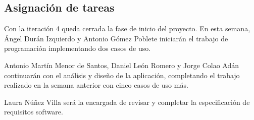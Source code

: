 \documentclass[a4paper,11pt,oneside]{article}
\begin{document}
\subsection*{Asignación de tareas}

Con la iteración 4 queda cerrada la fase de inicio del proyecto. En esta
semana, Ángel Durán Izquierdo y Antonio Gómez Poblete iniciarán el trabajo de
programación implementando dos casos de uso.

Antonio Martín Menor de Santos, Daniel León Romero y Jorge Colao Adán
continuarán con el análisis y diseño de la aplicación, completando el trabajo
realizado en la semana anterior con cinco casos de uso más.

Laura Núñez Villa será la encargada de revisar y completar la especificación de
requisitos software.
\end{document}

